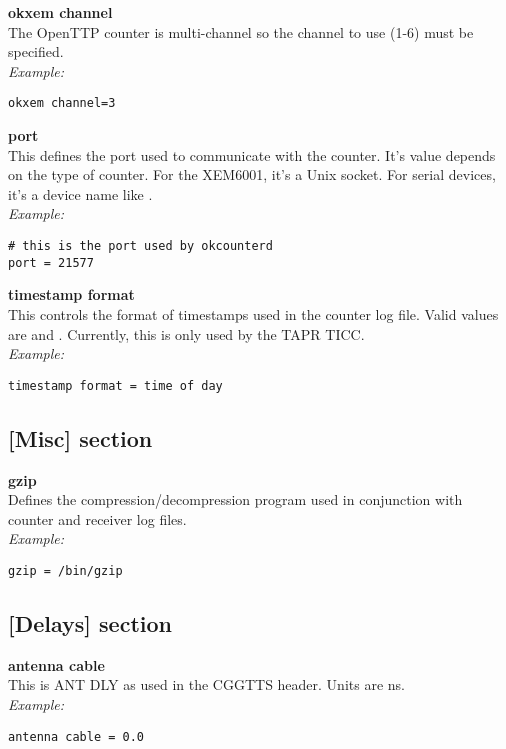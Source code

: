 {\bfseries okxem channel}\\ \hypertarget{h:counter_okxem_channel}{}
The OpenTTP counter is multi-channel so the channel to use (1-6) must be specified.\\
\textit{Example:}
\begin{lstlisting}
okxem channel=3
\end{lstlisting}

{\bfseries port}\\ \hypertarget{h:counter_port}{}
This defines the port used to communicate with the counter. It's value depends on the type of counter. 
For the XEM6001, it's a Unix socket. For serial devices, it's a device name like
.\\
\textit{Example:}
\begin{lstlisting}
# this is the port used by okcounterd
port = 21577 
\end{lstlisting}

{\bfseries timestamp format}\\ \hypertarget{h:counter_timestamp_format}{}
This controls the format of timestamps used in the counter log file.
Valid values are  and .
Currently, this is only used by the TAPR TICC.\\
\textit{Example:}
\begin{lstlisting}
timestamp format = time of day
\end{lstlisting}

\subsection{[Misc] section}

\hypertarget{h:misc}{}

{\bfseries gzip}\\
Defines the compression/decompression program used in conjunction with counter and receiver log files.\\
\textit{Example:}
\begin{lstlisting}
gzip = /bin/gzip 
\end{lstlisting}

\subsection{[Delays] section}

\hypertarget{h:delays}{}

{\bfseries antenna cable}\\
This is ANT DLY as used in the CGGTTS header. Units are ns.\\
\textit{Example:}
\begin{lstlisting}
antenna cable = 0.0
\end{lstlisting}

